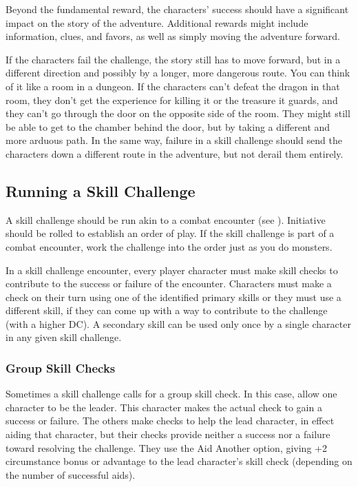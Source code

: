 Beyond the fundamental reward, the characters' success should have a significant impact on the story of the adventure. Additional rewards might include information, clues, and favors, as well as simply moving the adventure forward.

If the characters fail the challenge, the story still has to move forward, but in a different direction and possibly by a longer, more dangerous route. You can think of it like a room in a dungeon. If the characters can't defeat the dragon in that room, they don't get the experience for killing it or the treasure it guards, and they can't go through the door on the opposite side of the room. They might still be able to get to the chamber behind the door, but by taking a different and more arduous path. In the same way, failure in a skill challenge should send the characters down a different route in the adventure, but not derail them entirely.

\subsection{Running a Skill Challenge}
A skill challenge should be run akin to a combat encounter (see ). Initiative should be rolled to establish an order of play. If the skill challenge is part of a combat encounter, work the challenge into the order just as you do monsters.

In a skill challenge encounter, every player character must make skill checks to contribute to the success or failure of the encounter. Characters must make a check on their turn using one of the identified primary skills or they must use a different skill, if they can come up with a way to contribute to the challenge (with a higher DC). A secondary skill can be used only once by a single character in any given skill challenge.

\subsubsection{Group Skill Checks}
Sometimes a skill challenge calls for a group skill check. In this case, allow one character to be the leader. This character makes the actual check to gain a success or failure. The others make checks to help the lead character, in effect aiding that character, but their checks provide neither a success nor a failure toward resolving the challenge. They use the Aid Another option, giving +2 circumstance bonus or advantage to the lead character's skill check (depending on the number of successful aids).